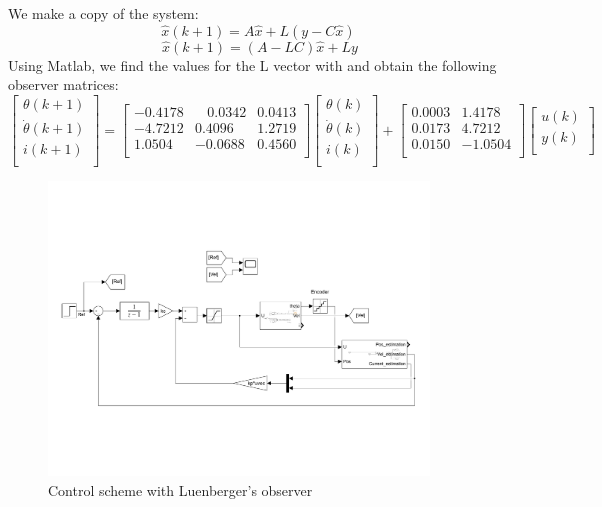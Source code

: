 We make a copy of the system:
\[\hat{x}\left(k+1\right)=A\hat{x}+L(y-C\hat{x})\ \]
\[\hat{x}\left(k+1\right)=(A-LC)\hat{x}+Ly\]
Using Matlab, we find the values for the L vector with and obtain the following observer matrices:
\[\left[\begin{matrix}\theta(k+1)\\\dot{\theta}(k+1)\\i(k+1)\\\end{matrix}\right]=\left[\begin{matrix}-0.4178&\ \ \ \ 0.0342&0.0413\\-4.7212&0.4096&1.2719\\1.0504&-0.0688&0.4560\\\end{matrix}\right]\left[\begin{matrix}\theta(k)\\\dot{\theta}(k)\\i(k)\\\end{matrix}\right]+\left[\begin{matrix}0.0003&1.4178\\0.0173&4.7212\\0.0150&-1.0504\\\end{matrix}\right]\left[\begin{matrix}u(k)\\y(k)\\\end{matrix}\right]\]

\begin{figure}[h!]
    \centering
 	\includegraphics[trim=0 0 0 0,clip,width=0.9\textwidth]{Figs/Control_motor.pdf}
    \caption{Control scheme with Luenberger's observer}
    \label{fig:Speed_Control_scheme}
\end{figure}

